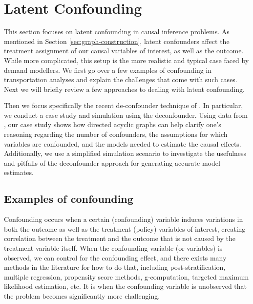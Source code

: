 \section{Latent Confounding}
\label{sec:latent-confounding}

This section focuses on latent confounding in causal inference problems.
As mentioned in Section \ref{sec:graph-construction},  latent confounders affect the treatment assignment of our causal variables of interest, as well as the outcome.
While more complicated, this setup is the more realistic and typical case faced by demand modellers.
We first go over a few examples of confounding in transportation analyses and explain
the challenges that come with such cases.
Next we will briefly review a few approaches to dealing with latent confounding.

Then we focus specifically the recent de-confounder technique of \citet{wang_2019_blessings}.
In particular, we conduct a case study and simulation using the deconfounder.
Using data from \citet{brathwaite_asymmetric}, our case study shows how directed acyclic graphs can help clarify
one's reasoning regarding the number of confounders,
the assumptions for which variables are confounded,
and the models needed to estimate the causal effects.
Additionally, we use a simplified simulation scenario to investigate the usefulness
and pitfalls of the deconfounder approach for generating accurate model estimates.

\subsection{Examples of confounding}
\label{sec:confounding-examples}

Confounding occurs when a certain (confounding) variable induces variations in
both the outcome as well as the treatment (policy) variables of interest,
creating correlation between the treatment and the outcome that is not caused
by the treatment variable itself. When the confounding variable (or variables) is
observed, we can control for the confounding effect, and there exists many
methods in the literature for how to do that, including post-stratification,
multiple regression, propensity score methods, g-computation, targeted maximum likelihood estimation, etc.
It is when the confounding variable is unobserved that the problem becomes significantly more challenging.

